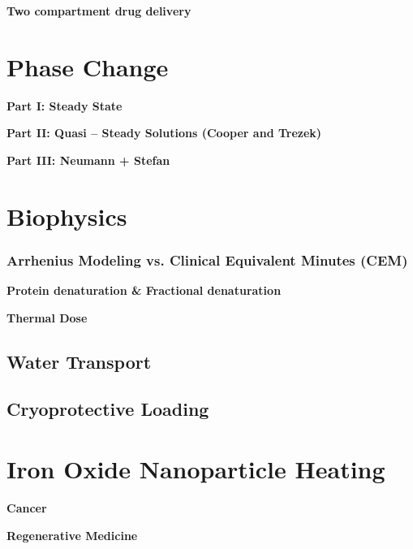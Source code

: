 \begin{appendices}
\begin{example}
\textbf{Two compartment drug delivery}
\end{example}

\section{Phase Change}
\begin{example}
\textbf{Part I: Steady State}
\end{example}

\begin{example}
\textbf{Part II: Quasi – Steady Solutions (Cooper and Trezek)}
\end{example}

\begin{example}
\textbf{Part III:  Neumann + Stefan}
\end{example}

\section{Biophysics}
\subsubsection{Arrhenius Modeling vs. Clinical Equivalent Minutes (CEM)}
\begin{example}
\textbf{Protein denaturation \& Fractional denaturation}
\end{example}

\begin{example}
\textbf{Thermal Dose}
\end{example}

\subsection{Water Transport}
\subsection{Cryoprotective Loading}

\section{Iron Oxide Nanoparticle Heating}

\begin{example}
\textbf{Cancer}
\end{example}

\begin{example}
\textbf{Regenerative Medicine}
\end{example}

\end{appendices}
